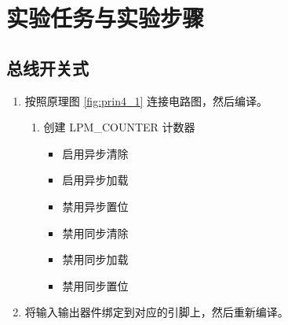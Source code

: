 \section{实验任务与实验步骤}

\subsection{总线开关式}

\begin{enumerate}
    \item 按照原理图 \ref{fig:prin4_1} 连接电路图，然后编译。
    
    \begin{enumerate}
        \item 创建 LPM\_COUNTER 计数器
        
        \begin{itemize}
            \item 启用异步清除
            \item 启用异步加载
            \item 禁用异步置位
            \item 禁用同步清除
            \item 禁用同步加载
            \item 禁用同步置位
        \end{itemize}
        
    \end{enumerate}
    
    \item 将输入输出器件绑定到对应的引脚上，然后重新编译。
    

\end{enumerate}
